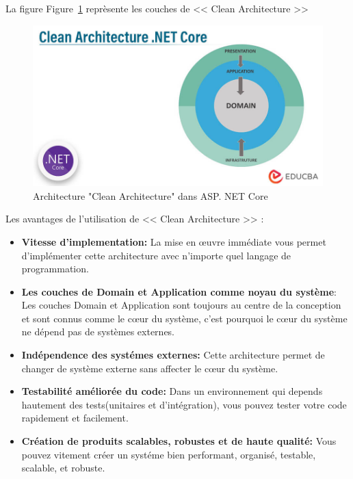 \noindent
La figure Figure~\ref{fig:architecture} reprèsente les couches de << Clean Architecture >>

\begin{figure}[H]
\centering
\includegraphics[width=1\textwidth]{logos/clean_architecture.png}
\caption{Architecture "Clean Architecture" dans ASP. NET Core}
\label{fig:architecture}
\end{figure}

\noindent
Les avantages de l’utilisation de  << Clean Architecture >> :

\begin{itemize}[label={---}]
    \item \small\textbf{Vitesse d'implementation: } La mise en œuvre immédiate vous permet d'implémenter cette architecture avec n'importe quel langage de programmation.

    \item \small\textbf{Les couches de Domain et Application comme noyau du système}: Les couches Domain et Application sont toujours au centre de la conception et sont connus comme le cœur du système, c'est pourquoi le cœur du système ne dépend pas de systèmes externes. 

    \item \small\textbf{Indépendence des systémes externes: } Cette architecture permet de changer de système externe sans affecter le cœur du système.

    \item \small\textbf{Testabilité améliorée du code: } Dans un environnement qui depends hautement des tests(unitaires et d'intégration), vous pouvez tester votre code rapidement et facilement.    

    \item \small\textbf{Création de produits scalables, robustes et de haute qualité: } Vous pouvez vitement créer un systéme bien performant, organisé, testable, scalable, et robuste.
\end{itemize}
\noindent